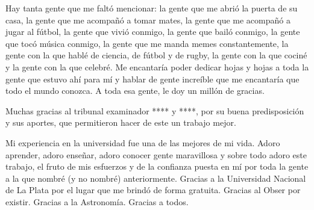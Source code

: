	Hay tanta gente que me faltó mencionar: la gente que me abrió la puerta de su casa, la gente que me acompañó a tomar mates, la gente que me acompañó a jugar al fútbol, la gente que vivió conmigo, la gente que bailó conmigo, la gente que tocó música conmigo, la gente que me manda memes constantemente, la gente con la que hablé de ciencia, de fútbol y de rugby, la gente con la que cociné y la gente con la que celebré. Me encantaría poder dedicar hojas y hojas a toda la gente que estuvo ahí para mí y hablar de gente increíble que me encantaría que todo el mundo conozca. A toda esa gente, le doy un millón de gracias.

	Muchas gracias al tribunal examinador **** y ****, por su buena predisposición y sus aportes, que permitieron hacer de este un trabajo mejor.

	Mi experiencia en la universidad fue una de las mejores de mi vida. Adoro aprender, adoro enseñar, adoro conocer gente maravillosa y sobre todo adoro este trabajo, el fruto de mis esfuerzos y de la confianza puesta en mí por toda la gente a la que nombré (y no nombré) anteriormente. 
	Gracias a la Universidad Nacional de La Plata por el lugar que me brindó de forma gratuita. Gracias al Obser por existir. Gracias a la Astronomía. Gracias a todos.

\newpage
\endinput
